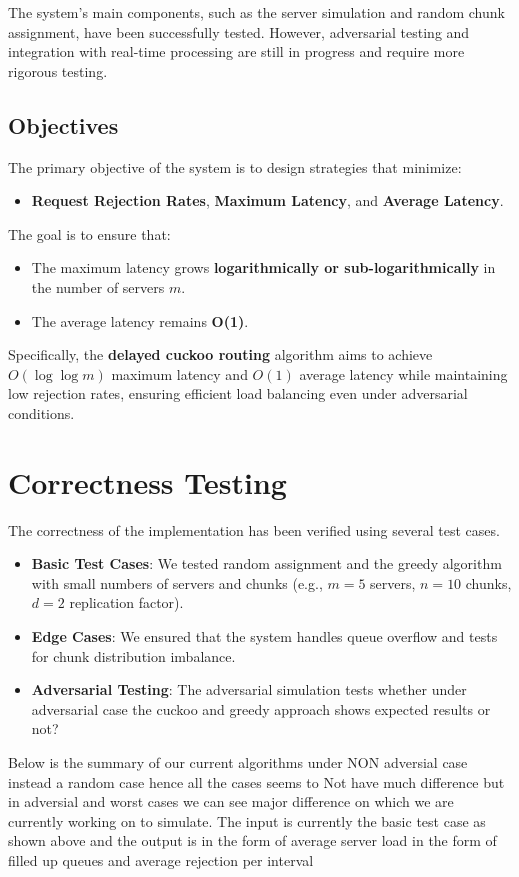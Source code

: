 \documentclass{article}
\begin{document}
The system's main components, such as the server simulation and random chunk assignment, have been successfully tested. However, adversarial testing and integration with real-time processing are still in progress and require more rigorous testing.

\subsection*{Objectives}

The primary objective of the system is to design strategies that minimize:
\begin{itemize}
    \item \textbf{Request Rejection Rates}, \textbf{Maximum Latency}, and \textbf{Average Latency}.
\end{itemize}
The goal is to ensure that:
\begin{itemize}
    \item The maximum latency grows \textbf{logarithmically or sub-logarithmically} in the number of servers $m$.
    \item The average latency remains \textbf{O(1)}.
\end{itemize}
Specifically, the \textbf{delayed cuckoo routing} algorithm aims to achieve \( O(\log \log m) \) maximum latency and \( O(1) \) average latency while maintaining low rejection rates, ensuring efficient load balancing even under adversarial conditions.


\section*{Correctness Testing}
The correctness of the implementation has been verified using several test cases. 
\begin{itemize}
    \item \textbf{Basic Test Cases}: We tested random assignment and the greedy algorithm with small numbers of servers and chunks (e.g., $m = 5$ servers, $n = 10$ chunks, $d = 2$ replication factor).
    \item \textbf{Edge Cases}: We ensured that the system handles queue overflow and tests for chunk distribution imbalance.
    \item \textbf{Adversarial Testing}: The adversarial simulation tests whether under adversarial case the cuckoo and greedy approach shows expected results or not?
\end{itemize}

Below is the summary of our current algorithms under NON adversial case instead a random case hence all the cases seems to Not have much difference but in adversial and worst cases we can see major difference on which we are currently working on to simulate. 
The input is currently the basic test case as shown above and the output is in the form of average server load in the form of filled up queues and average rejection per interval
\end{document}
